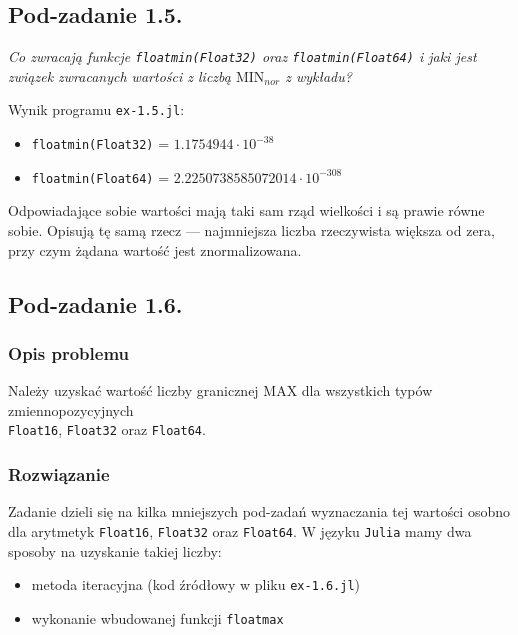 \documentclass[10pt]{article}
\begin{document}
\subsection{Pod-zadanie 1.5.}
\textit{Co zwracają funkcje \texttt{floatmin(Float32)} oraz \texttt{floatmin(Float64)} i jaki jest związek zwracanych wartości z liczbą $\mathrm{MIN}_{nor}$ z wykładu?}

Wynik programu \texttt{ex-1.5.jl}:
\begin{itemize}
    \item \texttt{floatmin(Float32)} = $1.1754944 \cdot 10^{-38}$
    \item \texttt{floatmin(Float64)} = $2.2250738585072014 \cdot 10^{-308}$
\end{itemize}

Odpowiadające sobie wartości mają taki sam rząd wielkości i są prawie równe sobie. Opisują tę samą rzecz — najmniejsza liczba rzeczywista większa od zera, przy czym żądana wartość jest znormalizowana.

\subsection{Pod-zadanie 1.6.}

\subsubsection{Opis problemu}
Należy uzyskać wartość liczby granicznej $\mathrm{MAX}$ dla wszystkich typów zmiennopozycyjnych\\ \texttt{Float16}, \texttt{Float32} oraz \texttt{Float64}.

\subsubsection{Rozwiązanie}
Zadanie dzieli się na kilka mniejszych pod-zadań wyznaczania tej wartości osobno dla arytmetyk \texttt{Float16}, \texttt{Float32} oraz \texttt{Float64}.
W języku \texttt{Julia} mamy dwa sposoby na uzyskanie takiej liczby:
\begin{itemize}
    \item metoda iteracyjna (kod źródłowy w pliku \texttt{ex-1.6.jl})
    \item wykonanie wbudowanej funkcji \texttt{floatmax}
\end{itemize}
\end{document}
